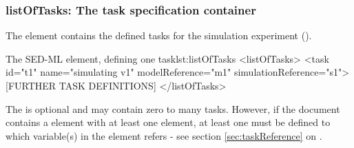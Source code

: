   \subsubsection{listOfTasks: The task specification container}
\label{sec:listOfTasks}
The  element contains the defined tasks for the simulation experiment ().
%
%

%
\begin{myXmlLst}{The SED-ML  element, defining one task}{lst:listOfTasks}
<listOfTasks>
 <task id="t1" name="simulating v1" modelReference="m1" simulationReference="s1">
 [FURTHER TASK DEFINITIONS]
</listOfTasks>
\end{myXmlLst}
The  is optional and may contain zero to many tasks. However, if the \LoneVone document contains  a    element with at least one   element, at least one   must be defined to which variable(s) in the    element refers -  see  section \ref{sec:taskReference} on .

%

